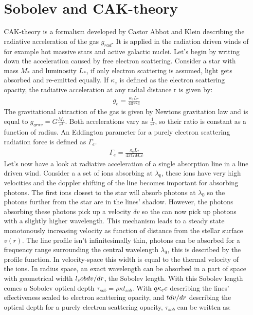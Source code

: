\section{Sobolev and CAK-theory}
CAK-theory is a formalism developed by Castor Abbot and Klein \cite{CAK} describing the radiative acceleration of the gas $g_{rad}$. It is applied in the radiation driven winds of for example hot massive stars  and active galactic nuclei. Let's begin by writing down the acceleration caused by free electron scattering. Consider a star with mass $M_*$ and luminosity $L_*$, if only electron scattering is assumed, light gets absorbed and re-emitted equally. If $\kappa_e$ is defined as the electron scattering opacity, the radiative acceleration at any radial distance r is given by:
\begin{align}
g_e = \frac{\kappa_e L_*}{4 \pi r^2 c}
\end{align}
The gravitational attraction of the gas is given by Newtons gravitation law and is equal to $g_{grav} = G\frac{M_*}{r^2}$. Both accelerations vary as $\frac{1}{r^2}$, so their ratio is constant as a function of radius. An Eddington parameter for a purely electron scattering radiation force is defined as $\Gamma_e$.
\begin{align}
\Gamma_e = \frac{\kappa_e L_*}{4 \pi G M_* c}
\end{align}
Let's now have a look at radiative acceleration of a single absorption line in a line driven wind. Consider a a set of ions absorbing at $\lambda_0$, these ions have very high velocities and the doppler shifting of the line becomes important for absorbing photons. The first ions closest to the star will absorb photons at $\lambda_0$ so the photons further from the star are in the lines' shadow. However, the photons absorbing these photons pick up a velocity $\delta v$ so the can now pick up photons with a slightly higher wavelength. This mechanism leads to a steady state monotonously increasing velocity as function of distance from the stellar surface $v(r)$. The line profile isn't infinitesimally thin, photons can be absorbed for a frequency range surrounding the central wavelength $\lambda_0$, this is described by the profile function. In velocity-space this width is equal to the thermal velocity of the ions. In radius space, an exact wavelength can be absorbed in a part of space with geometrical width $l_sob \def \frac{v_{th}}{dv/dr}$, the Sobolev length. With this Sobolev length comes a Sobolev optical depth $\tau_{sob} = \rho \kappa l_{sob}$. With $q \def \frac{\kappa v_{th}}{\kappa_e c}$ describing the lines' effectiveness scaled to electron scattering opacity, and $t \def  \frac{\rho \kappa_e c}{dv/dr}$ describing the optical depth for a purely electron scattering opacity, $\tau_{sob}$ can be written as:
